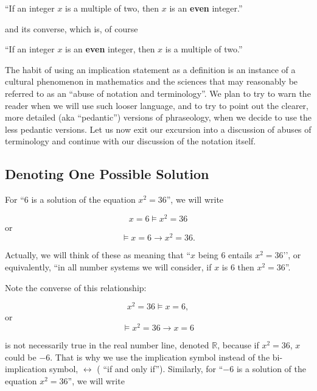 \documentclass{book}
\theoremstyle{definition}
\begin{document}
``If an integer $x$ is a multiple of two, then $x$ is an {\bf even} integer.''

and its converse, which is, of course 

``If an integer $x$ is an {\bf even} integer, then $x$ is a multiple of two.''

The habit of using an implication statement as a definition is an instance of a cultural phenomenon in mathematics and the sciences that may reasonably be referred to as an ``abuse of notation and terminology''.  We plan to try to warn the reader when we will use such looser language, and to try to point out the clearer, more detailed (aka ``pedantic'') versions of phraseology, when we decide to use the less pedantic versions.  Let us now exit our excursion into a discussion of abuses of terminology and continue with our discussion of the notation itself.  

\subsection{Denoting One Possible Solution}

For ``$6$ is a solution of the equation $x^2=36$'', we will write 

\begin{equation}\label{(3.1)}
x=6 \models x^2=36
\end{equation}
or  
\begin{equation}\label{(3.2)}
\models x=6 \rightarrow x^2=36.  
\end{equation}

Actually, we will think of these as meaning that ``$x$ being $6$ entails $x^2=36$’’, or equivalently, ``in all number systems we will consider, if $x$ is $6$ then $x^2=36$''.

Note the converse of this relationship: 
	
\begin{equation}\label{(3.3)}
x^2=36\models x=6, 
\end{equation} 
or  
\begin{equation}\label{(3.4)}
\models x^2=36\rightarrow x=6
\end{equation}
 
is not necessarily true in the real number line, denoted $\mathbb{R}$, because if $x^2=36$, $x$ could be $-6$. That is why we use the implication symbol instead of the bi-implication symbol, $\leftrightarrow$ ( “if and only if”). Similarly, for ``$-6$ is a solution of the equation $x^2=36$'', we will write 
\end{document}
